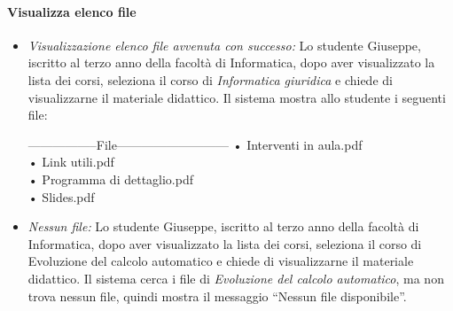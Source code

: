 \paragraph{Visualizza elenco file}
\begin{itemize}
	\item \textit{Visualizzazione elenco file avvenuta con successo:}
	Lo studente Giuseppe, iscritto al terzo anno della facoltà di Informatica, dopo aver visualizzato la lista dei corsi, seleziona il corso di \textit{Informatica giuridica} e chiede di visualizzarne il materiale didattico. Il sistema mostra allo studente i seguenti file: 
	\begin{tabbing}
		\hspace{1cm}-----------------File---------------------------\kill
		\hspace{1cm} • Interventi in aula.pdf  \\
		\hspace{1cm} • Link utili.pdf  \\
		\hspace{1cm} • Programma di dettaglio.pdf  \\	
		\hspace{1cm} • Slides.pdf  \\
	\end{tabbing} 
	
	\item \textit{Nessun file:}
	Lo studente Giuseppe, iscritto al terzo anno della facoltà di Informatica, dopo aver visualizzato la lista dei corsi, seleziona il corso di Evoluzione del calcolo automatico  e chiede di visualizzarne il materiale didattico. Il sistema cerca i file di \textit{Evoluzione del calcolo automatico}, ma non trova nessun file, quindi mostra il messaggio “Nessun file disponibile”.
\end{itemize}

